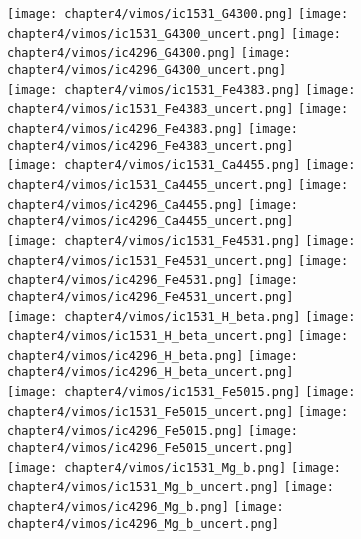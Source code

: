 \begin{figure*}
	\centering
	\texttt{[image: chapter4/vimos/ic1531\_G4300.png]}
	\texttt{[image: chapter4/vimos/ic1531\_G4300\_uncert.png]}
	\texttt{[image: chapter4/vimos/ic4296\_G4300.png]}
	\texttt{[image: chapter4/vimos/ic4296\_G4300\_uncert.png]}
	\\
	\texttt{[image: chapter4/vimos/ic1531\_Fe4383.png]}
	\texttt{[image: chapter4/vimos/ic1531\_Fe4383\_uncert.png]}
	\texttt{[image: chapter4/vimos/ic4296\_Fe4383.png]}
	\texttt{[image: chapter4/vimos/ic4296\_Fe4383\_uncert.png]}
	\\
	\texttt{[image: chapter4/vimos/ic1531\_Ca4455.png]}
	\texttt{[image: chapter4/vimos/ic1531\_Ca4455\_uncert.png]}
	\texttt{[image: chapter4/vimos/ic4296\_Ca4455.png]}
	\texttt{[image: chapter4/vimos/ic4296\_Ca4455\_uncert.png]}
	\\
	\texttt{[image: chapter4/vimos/ic1531\_Fe4531.png]}
	\texttt{[image: chapter4/vimos/ic1531\_Fe4531\_uncert.png]}
	\texttt{[image: chapter4/vimos/ic4296\_Fe4531.png]}
	\texttt{[image: chapter4/vimos/ic4296\_Fe4531\_uncert.png]}
	\\
	\texttt{[image: chapter4/vimos/ic1531\_H\_beta.png]}
	\texttt{[image: chapter4/vimos/ic1531\_H\_beta\_uncert.png]}
	\texttt{[image: chapter4/vimos/ic4296\_H\_beta.png]}
	\texttt{[image: chapter4/vimos/ic4296\_H\_beta\_uncert.png]}
	\\
	\texttt{[image: chapter4/vimos/ic1531\_Fe5015.png]}
	\texttt{[image: chapter4/vimos/ic1531\_Fe5015\_uncert.png]}
	\texttt{[image: chapter4/vimos/ic4296\_Fe5015.png]}
	\texttt{[image: chapter4/vimos/ic4296\_Fe5015\_uncert.png]}
	\\
	\texttt{[image: chapter4/vimos/ic1531\_Mg\_b.png]}
	\texttt{[image: chapter4/vimos/ic1531\_Mg\_b\_uncert.png]}
	\texttt{[image: chapter4/vimos/ic4296\_Mg\_b.png]}
	\texttt{[image: chapter4/vimos/ic4296\_Mg\_b\_uncert.png]}
	\\
\end{figure*}

